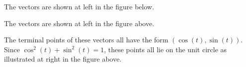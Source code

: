 \begin{activitySolution}
    \ba
    \item The vectors are shown at left in the figure below. 
      \begin{center}
       
      \end{center}
    

    \item The vectors are shown at left in the figure above. 


   \item The terminal points of these vectors all have the form $(\cos(t), \sin(t))$. Since $\cos^2(t) + \sin^2(t) = 1$, these points all lie on the unit circle as illustrated at right in the figure above.


    \ea
\end{activitySolution}

\afterpa 